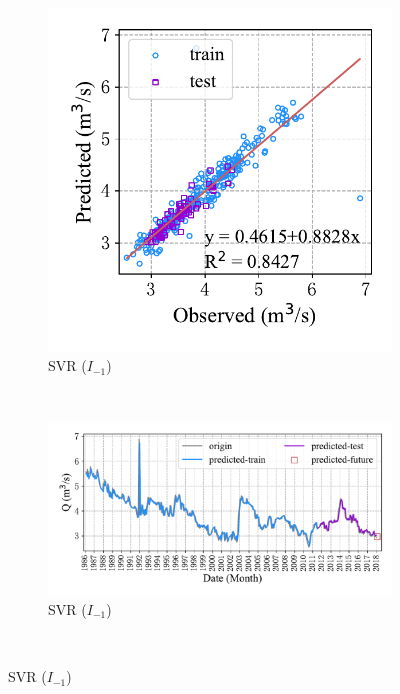 \begin{figure}[!htbp]
\begin{subfigure}[b]{0.615\textwidth}
  \end{subfigure}
  \\\vspace{-0.2cm}
  \begin{subfigure}[b]{0.304\textwidth}
    \includegraphics[width=\textwidth]{Img/chap4_spr/spr_scatter_in_1_out_1_svr_only.pdf}
    \caption{SVR ($I_{-1}$)}
    \label{fig:spr_scatter_in_1_out_1_svr_only}
  \end{subfigure}
  ~
  \begin{subfigure}[b]{0.615\textwidth}
    \includegraphics[width=\textwidth]{Img/chap4_spr/spr_series_in_1_out_1_svr_only.pdf}
    \caption{SVR ($I_{-1}$)}
    \label{fig:spr_series_in_1_out_1_svr_only}
  \end{subfigure}
  \\
  \vspace{-0.2cm}
  \label{fig:spr_in_1_out_1_only}
\end{figure}

